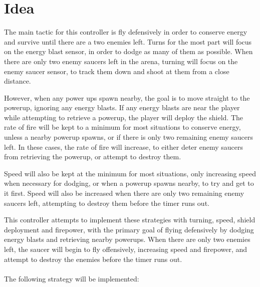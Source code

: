 \section{Idea}

The main tactic for this controller is fly defensively in order to conserve energy and survive until there are a two enemies left. Turns for the most part will focus on the energy blast sensor, in order to dodge as many of them as possible. When there are only two enemy saucers left in the arena, turning will focus on the enemy saucer sensor, to track them down and shoot at them from a close distance.

However, when any power ups spawn nearby, the goal is to move straight to the powerup, ignoring any energy blasts. If any energy blasts are near the player while attempting to retrieve a powerup, the player will deploy the shield. The rate of fire will be kept to a minimum for most situations to conserve energy, unless a nearby powerup spawns, or if there is only two remaining enemy saucers left. In these cases, the rate of fire will increase, to either deter enemy saucers from retrieving the powerup, or attempt to destroy them.

Speed will also be kept at the minimum for most situations, only increasing speed when necessary for dodging, or when a powerup spawns nearby, to try and get to it first. Speed will also be increased when there are only two remaining enemy saucers left, attempting to destroy them before the timer runs out.

This controller attempts to implement these strategies with turning, speed, shield deployment and firepower, with the primary goal of flying defensively by dodging energy blasts and retrieving nearby powerups. When there are only two enemies left, the saucer will begin to fly offensively, increasing speed and firepower, and attempt to destroy the enemies before the timer runs out.
\\
\\
The following strategy will be implemented:

